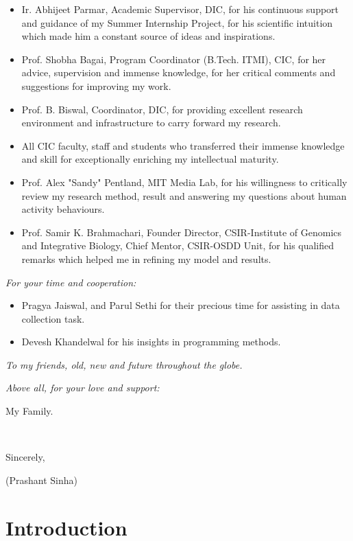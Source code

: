 \documentclass[
10pt,           %
a4paper,        %
oneside,        %
headinclude,footinclude, %
]{scrartcl}
\begin{document}
\begin{itemize}
  \item Ir. Abhijeet Parmar, Academic Supervisor, DIC, for his continuous support and guidance of my Summer Internship Project, for his scientific intuition which made him a constant source of ideas and inspirations.
  \item Prof. Shobha Bagai, Program Coordinator (B.Tech. ITMI), CIC, for her advice, supervision and immense knowledge, for her critical comments and suggestions for improving my work.
  \item Prof. B. Biswal, Coordinator, DIC, for providing excellent research environment and infrastructure to carry forward my research.
  \item All CIC faculty, staff and students who transferred their immense knowledge and skill for exceptionally enriching my intellectual maturity.
  \item Prof. Alex "Sandy" Pentland, MIT Media Lab, for his willingness to critically review my research method, result and answering my questions about human activity behaviours.
  \item Prof. Samir K. Brahmachari, Founder Director, CSIR-Institute of Genomics and Integrative Biology, Chief Mentor, CSIR-OSDD Unit, for his qualified remarks which helped me in refining my model and results.
\end{itemize}

\emph{For your time and cooperation:}

\begin{itemize}
  \item Pragya Jaiswal, and Parul Sethi for their precious time for assisting in data collection task.
  \item Devesh Khandelwal for his insights in programming methods.
\end{itemize}

\emph{To my friends, old, new and future throughout the globe.}

\emph{Above all, for your love and support:}

My Family.

\
\

Sincerely,

(Prashant Sinha)


\setlength{\parindent}{1em}

\newpage
\section{Introduction}
\end{document}
